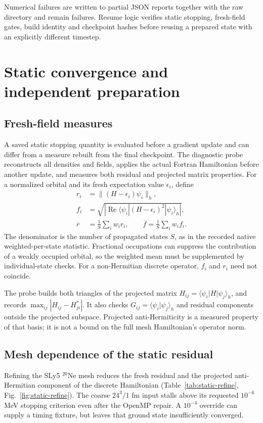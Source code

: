 \documentclass[11pt,a4paper]{article}
\newcommand{\Ne}{\texorpdfstring{\ensuremath{^{20}\mathrm{Ne}}}{20Ne}}
\newcommand{\sepsection}[1]{\FloatBarrier\section{#1}}
\begin{document}
Numerical failures are written to partial JSON reports together with the
raw directory and remain failures. Resume logic verifies static stopping,
fresh-field gates, build identity and checkpoint hashes before reusing a
prepared state with an explicitly different timestep.

\sepsection{Static convergence and independent preparation}
\label{sec:static}
\subsection{Fresh-field measures}
A saved static stopping quantity is evaluated before a gradient update and
can differ from a measure rebuilt from the final checkpoint. The diagnostic
probe reconstructs all densities and fields, applies the actual Fortran
Hamiltonian before another update, and measures both residual and projected
matrix properties. For a normalized orbital and its fresh expectation value
$\epsilon_i$, define
\begin{align}
 r_i&=\|(H-\epsilon_i)\psi_i\|_h,\\
 f_i&=\sqrt{\left|\operatorname{Re}
       \langle\psi_i|(H-\epsilon_i)^2|\psi_i\rangle_h\right|},\\
 \overline r&=\frac{1}{S}\sum_i w_i r_i,
 \qquad \overline f=\frac{1}{S}\sum_i w_i f_i.
\end{align}
The denominator is the number of propagated states $S$, as in the recorded
native weighted-per-state statistic. Fractional occupations can suppress
the contribution of a weakly occupied orbital, so the weighted mean must
be supplemented by individual-state checks. For a non-Hermitian discrete operator,
$f_i$ and $r_i$ need not coincide.

The probe builds both triangles of the projected matrix
$H_{ij}=\langle\psi_i|H|\psi_j\rangle_h$, and records
$\max_{ij}|H_{ij}-H_{ji}^*|$. It also checks
$G_{ij}=\langle\psi_i|\psi_j\rangle_h$ and residual components outside the
projected subspace. Projected anti-Hermiticity is a measured property of that
basis; it is not a bound on the full mesh Hamiltonian's operator norm.

\subsection{Mesh dependence of the static residual}
Refining the SLy5 \Ne{} mesh reduces the fresh residual and the
projected anti-Hermitian component of the discrete Hamiltonian
(Table~\ref{tab:static-refine}, Fig.~\ref{fig:static-refine}). The coarse
$24^3/1$ fm input stalls above its requested $10^{-6}$ MeV stopping
criterion even after the OpenMP repair. A $10^{-4}$ override can supply
a timing fixture, but leaves that ground state insufficiently converged.
\end{document}
